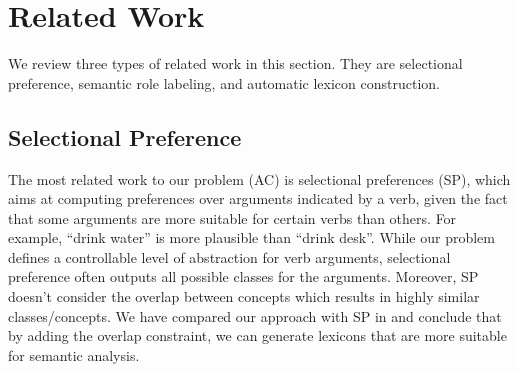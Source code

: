 \section{Related Work}
\label{sec:related}
We review three types of related work in this section.
They are selectional preference, semantic role labeling,
and automatic lexicon construction.

\subsection{Selectional Preference}
The most related work to our problem (AC) is
selectional preferences (SP), which
aims at computing preferences over arguments indicated by a verb,
given the fact that some arguments are more
suitable for certain verbs than others. For example,
``drink water'' is more plausible than ``drink desk''.
While our problem defines a controllable level of abstraction
for verb arguments, selectional preference
often outputs all possible classes for the arguments.
Moreover, SP doesn't consider the overlap between concepts
which results in highly similar classes/concepts.
We have compared our approach with SP
in  and conclude that by adding the overlap constraint,
we can generate lexicons that are more suitable for semantic analysis.

